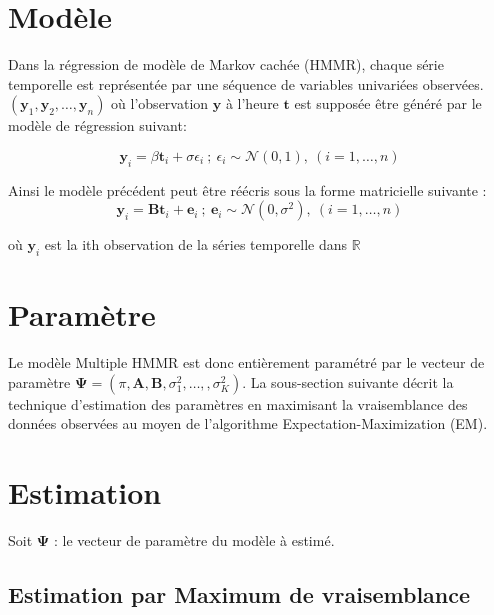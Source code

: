 \documentclass[11pt]{article}
\newcommand{\Rset}{\mathbb{R}}
\newcommand{\cN}{\mathcal{N}}
\newcommand{\bsy}{\boldsymbol{y}}
\newcommand{\bst}{\boldsymbol{t}}
\newcommand{\bse}{\boldsymbol{e}}
\newcommand{\bA}{\mathbf{A}}
\newcommand{\bB}{\mathbf{B}}
\newcommand{\bsPsi}{\boldsymbol{\Psi}}
\begin{document}
\newpage
\tableofcontents
\newpage
\section*{Modèle}

Dans la régression de modèle de Markov cachée (HMMR), chaque série temporelle est représentée par une séquence de variables univariées observées. $(\bsy_{1},\bsy_{2},\ldots,\bsy_{n})$ où l'observation $\bsy$ à l'heure $\bst$ est supposée être généré par le modèle de régression suivant: 

\begin{equation}
\bsy_{i} = \beta \bst_{i} + \sigma \epsilon_{i} \ ; \ \epsilon_{i} \sim \cN(0,1), \ ( i = 1,\ldots,n)
\end{equation}

Ainsi le modèle précédent peut être réécris sous la forme matricielle suivante : \\

\begin{equation}
\bsy_{i} = \bB \bst_{i} + \bse_{i} \  ; \  \bse_{i} \sim \cN(0,\sigma^{2}), \ (i=1,\ldots,n)
\end{equation}

où $\bsy_{i}$ est la ith observation de la séries temporelle dans $\Rset$



\section{Paramètre}

Le modèle Multiple HMMR est donc entièrement paramétré par le vecteur de paramètre $\bsPsi =(\pi,\bA,\bB,\sigma_{1}^{2}, \ldots,  ,\sigma_{K}^{2})$. La sous-section suivante décrit la technique d’estimation des paramètres en maximisant la vraisemblance des données observées au moyen de l’algorithme Expectation-Maximization (EM). 


\section{Estimation}

Soit $\bsPsi$ : le vecteur de paramètre du modèle à estimé. \\
 

\subsection{Estimation par Maximum de vraisemblance}
\end{document}
